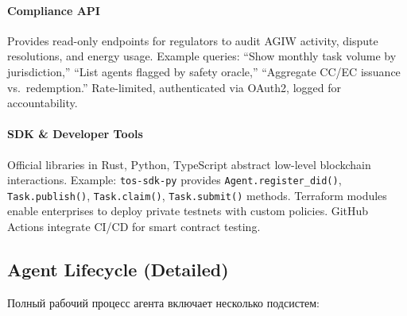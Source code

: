 \documentclass[11pt]{article}
\begin{document}
\paragraph{Compliance API} Provides read-only endpoints for regulators to audit AGIW activity, dispute resolutions, and energy usage. Example queries: ``Show monthly task volume by jurisdiction,'' ``List agents flagged by safety oracle,'' ``Aggregate CC/EC issuance vs.\ redemption.'' Rate-limited, authenticated via OAuth2, logged for accountability.

\paragraph{SDK \& Developer Tools} Official libraries in Rust, Python, TypeScript abstract low-level blockchain interactions. Example: \texttt{tos-sdk-py} provides \texttt{Agent.register\_did()}, \texttt{Task.publish()}, \texttt{Task.claim()}, \texttt{Task.submit()} methods. Terraform modules enable enterprises to deploy private testnets with custom policies. GitHub Actions integrate CI/CD for smart contract testing.

\subsection{Agent Lifecycle (Detailed)}
Полный рабочий процесс агента включает несколько подсистем:
\end{document}

